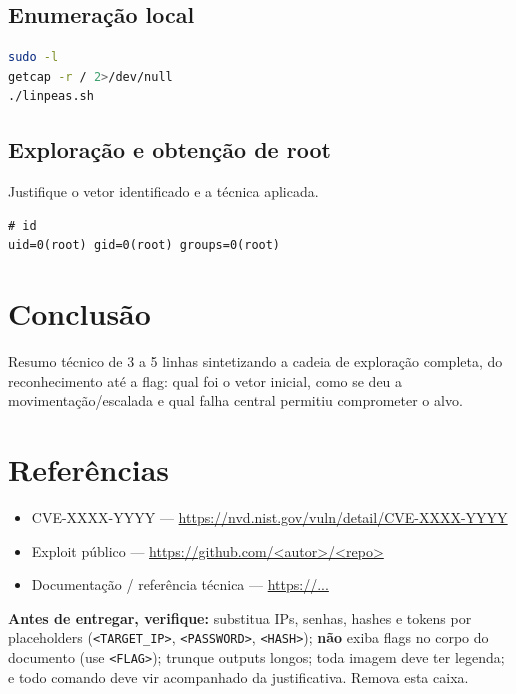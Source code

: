 \documentclass[12pt,a4paper]{article}
\begin{document}
\subsection{Enumeração local}
\begin{lstlisting}[language=bash,caption={Enumeração de vetores de privesc.}]
sudo -l
getcap -r / 2>/dev/null
./linpeas.sh
\end{lstlisting}

\subsection{Exploração e obtenção de root}
Justifique o vetor identificado e a técnica aplicada.

\begin{lstlisting}[style=output,caption={Comando final que comprova o acesso privilegiado.}]
# id
uid=0(root) gid=0(root) groups=0(root)
\end{lstlisting}

\section{Conclusão}
Resumo técnico de 3 a 5 linhas sintetizando a cadeia de exploração completa,
do reconhecimento até a flag: qual foi o vetor inicial, como se deu a
movimentação/escalada e qual falha central permitiu comprometer o alvo.

\section{Referências}
\begin{itemize}[leftmargin=1.5em]
  \item CVE-XXXX-YYYY --- \url{https://nvd.nist.gov/vuln/detail/CVE-XXXX-YYYY}
  \item Exploit público --- \url{https://github.com/<autor>/<repo>}
  \item Documentação / referência técnica --- \url{https://...}
\end{itemize}

\begin{nota}
\small\textbf{Antes de entregar, verifique:} substitua IPs, senhas, hashes e
tokens por placeholders (\texttt{<TARGET\_IP>}, \texttt{<PASSWORD>},
\texttt{<HASH>}); \textbf{não} exiba flags no corpo do documento
(use \texttt{<FLAG>}); trunque outputs longos; toda imagem deve ter legenda; e
todo comando deve vir acompanhado da justificativa. Remova esta caixa.
\end{nota}
\end{document}
